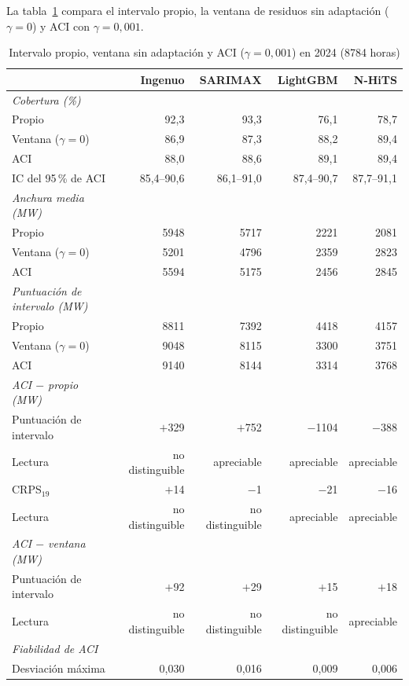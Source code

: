 La tabla~\ref{tab:final-aci} compara el intervalo propio, la ventana de
residuos sin adaptación ($\gamma = 0$) y ACI con $\gamma = 0{,}001$.

\begin{table}[htbp]
	\centering
	\caption{Intervalo propio, ventana sin adaptación y ACI ($\gamma = 0{,}001$) en 2024 (8784 horas)}
	\label{tab:final-aci}
	\small
	\setlength{\tabcolsep}{3.5pt}
	\begin{tabular}{lrrrr}
		\hline
		 & \textbf{Ingenuo} & \textbf{SARIMAX} & \textbf{LightGBM} & \textbf{N-HiTS} \\
		\hline
		\textit{Cobertura (\%)} & & & & \\
		\quad Propio & 92,3 & 93,3 & 76,1 & 78,7 \\
		\quad Ventana ($\gamma = 0$) & 86,9 & 87,3 & 88,2 & 89,4 \\
		\quad ACI & 88,0 & 88,6 & 89,1 & 89,4 \\
		\quad IC del 95\,\% de ACI & 85,4--90,6 & 86,1--91,0 & 87,4--90,7 & 87,7--91,1 \\
		\textit{Anchura media (MW)} & & & & \\
		\quad Propio & 5948 & 5717 & 2221 & 2081 \\
		\quad Ventana ($\gamma = 0$) & 5201 & 4796 & 2359 & 2823 \\
		\quad ACI & 5594 & 5175 & 2456 & 2845 \\
		\textit{Puntuación de intervalo (MW)} & & & & \\
		\quad Propio & 8811 & 7392 & 4418 & 4157 \\
		\quad Ventana ($\gamma = 0$) & 9048 & 8115 & 3300 & 3751 \\
		\quad ACI & 9140 & 8144 & 3314 & 3768 \\
		\textit{ACI $-$ propio (MW)} & & & & \\
		\quad Puntuación de intervalo & $+$329 & $+$752 & $-$1104 & $-$388 \\
		\quad Lectura & {\footnotesize no distinguible} & {\footnotesize apreciable} & {\footnotesize apreciable} & {\footnotesize apreciable} \\
		\quad CRPS$_{19}$ & $+$14 & $-$1 & $-$21 & $-$16 \\
		\quad Lectura & {\footnotesize no distinguible} & {\footnotesize no distinguible} & {\footnotesize apreciable} & {\footnotesize apreciable} \\
		\textit{ACI $-$ ventana (MW)} & & & & \\
		\quad Puntuación de intervalo & $+$92 & $+$29 & $+$15 & $+$18 \\
		\quad Lectura & {\footnotesize no distinguible} & {\footnotesize no distinguible} & {\footnotesize no distinguible} & {\footnotesize apreciable} \\
		\textit{Fiabilidad de ACI} & & & & \\
		\quad Desviación máxima & 0,030 & 0,016 & 0,009 & 0,006 \\
		\hline
	\end{tabular}
\end{table}


